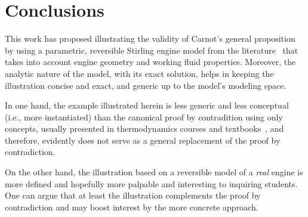 \section{Conclusions}

    This   work   has   proposed    illustrating    the    validity    of    Carnot's    general
    proposition~\cite{1897-ThurstonRH-Wiley} by using a parametric, reversible  Stirling  engine
    model from the literature~\cite{2012-ChengCH+YangHS-ApEnergy} that takes into account engine
    geometry and working fluid properties. Moreover, the analytic nature of the model, with  its
    exact solution, helps in keeping the illustration concise and exact, and generic up  to  the
    model's modeling space.

    In one hand, the example illustrated herein is less generic and less conceptual (i.e.,  more
    instantiated) than  the  canonical  proof  by  contradition  using  only  concepts,  usually
    presented  in   thermodynamics   courses   and   textbooks~\cite{2013-CengelYA+BolesMA-AMGH,
    2002-MoranMJ+ShapiroHN-LTC, 1986-JonesJB+HawkinsGA-Wiley}, and therefore, evidently does not
    serve as a general replacement of the proof by contradiction.

    On the other hand, the illustration based on a reversible model of a \emph{real}  engine  is
    more defined and hopefully more palpable and interesting  to  inquiring  students.  One  can
    argue that at least the illustration complements the proof by contradiction  and  may  boost
    interest by the more concrete approach.


